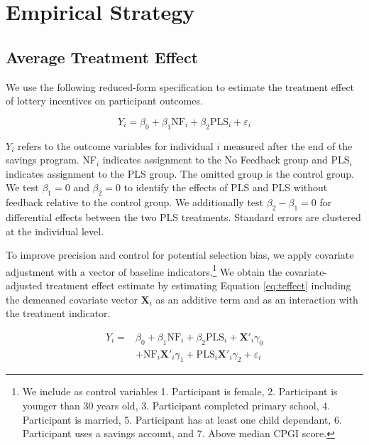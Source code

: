 \documentclass[11pt]{article}
\begin{document}
\section{Empirical Strategy} \label{sec:est}

	\subsection{Average Treatment Effect}

		We use the following reduced-form specification to estimate the treatment effect of lottery incentives on participant outcomes.

		\begin{equation} \label{eq:teffect}
			Y_{i} = \beta_{0} + \beta_{1}\text{NF}_{i} + \beta_{2}\text{PLS}_{i} + \varepsilon_{i}
		\end{equation}

		$Y_{i}$ refers to the outcome variables for individual $i$ measured after the end of the savings program. NF$_i$ indicates assignment to the No Feedback group and PLS$_i$ indicates assignment to the PLS group. The omitted group is the control group. We test $\beta_{1} = 0$ and $\beta_{2} = 0$ to identify the effects of PLS and PLS without feedback relative to the control group. We additionally test $\beta_{2} - \beta_{1} = 0$ for differential effects between the two PLS treatments. Standard errors are clustered at the individual level.

		To improve precision and control for potential selection bias, we apply covariate adjustment with a vector of baseline indicators.\footnote{We include as control variables 1. Participant is female, 2. Participant is younger than 30 years old, 3. Participant completed primary school, 4. Participant is married, 5. Participant has at least one child dependant, 6. Participant uses a savings account, and 7. Above median CPGI score.} We obtain the covariate-adjusted treatment effect estimate by estimating Equation \ref{eq:teffect} including the demeaned covariate vector $\mathbf{X}_{i}$ as an additive term and as an interaction with the treatment indicator.

		\begin{equation} \begin{split} \label{eq:controls}
			Y_{i} = & \beta_{0} + \beta_{1}\text{NF}_{i} + \beta_{2}\text{PLS}_{i} + \mathbf{X}'_i \gamma_{0} \\
					& + \text{NF}_{i} \mathbf{X}'_i \gamma_{1} + \text{PLS}_{i} \mathbf{X}'_i \gamma_{2} + \varepsilon_{i}
		\end{split} \end{equation}
\end{document}
